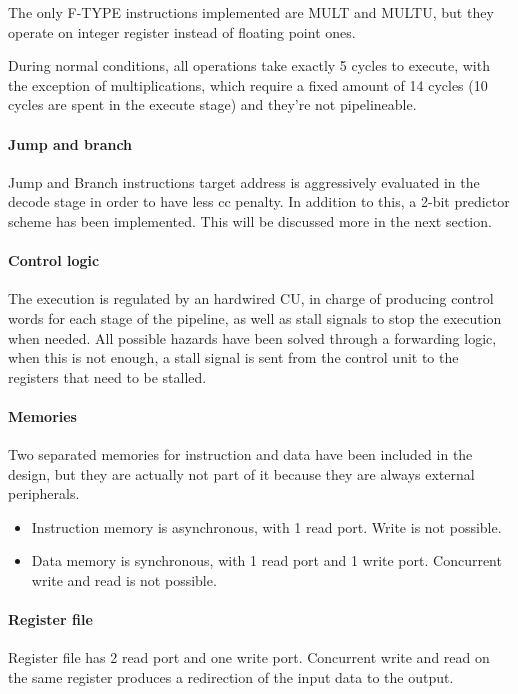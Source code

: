 \documentclass[12pt]{article}
\begin{document}
The only F-TYPE instructions implemented are MULT and MULTU, but they operate on integer register instead of floating point ones.

During normal conditions, all operations take exactly 5 cycles to execute, with the exception of multiplications, which require a fixed amount of 14 cycles (10 cycles are spent in the execute stage) and they're not pipelineable.

\paragraph{Jump and branch}
Jump and Branch instructions target address is aggressively evaluated in the decode stage in order to have less cc penalty.
In addition to this, a 2-bit predictor scheme has been implemented. This will be discussed more in the next section.

\paragraph{Control logic}
The execution is regulated by an hardwired CU, in charge of producing control words for each stage of the pipeline, as well as stall signals to stop the execution when needed.
All possible hazards have been solved through a forwarding logic, when this is not enough, a stall signal is sent from the control unit to the registers that need to be stalled.

\paragraph{Memories}
Two separated memories for instruction and data have been included in the design, but they are actually not part of it because they are always external peripherals.
\begin{itemize}
\item Instruction memory is asynchronous, with 1 read port. Write is not possible.
\item Data memory is synchronous, with 1 read port and 1 write port. Concurrent write and read is not possible.
\end{itemize}

\paragraph{Register file}
Register file has 2 read port and one write port. Concurrent write and read on the same register produces a redirection of the input data to the output.
\end{document}
